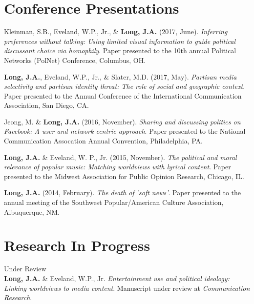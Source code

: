 \documentclass[margin,line]{res}
\begin{document}
\begin{resume}
\section{\sc Conference Presentations}

Kleinman, S.B., Eveland, W.P., Jr., \& \textbf{Long, J.A.} (2017, June). \emph{Inferring preferences without talking: Using limited visual information to guide political discussant choice via homophily}. Paper presented to the 10th annual Political Networks (PolNet) Conference, Columbus, OH.

{\bf Long, J.A.}, Eveland, W.P., Jr., \& Slater, M.D. (2017, May). \emph{Partisan media selectivity and partisan identity threat: The role of social and geographic context}. Paper presented to the Annual Conference of the International Communication Association, San Diego, CA.

Jeong, M. \&  {\bf Long, J.A.} (2016, November). \emph{Sharing and discussing politics on Facebook: A user and network-centric approach}. Paper presented to the National Communication Assocation Annual Convention, Philadelphia, PA.

{\bf Long, J.A.} \& Eveland, W. P., Jr. (2015, November). \emph{The political and moral relevance of popular music: Matching worldviews with lyrical content}. Paper presented to the Midwest Association for Public Opinion Research, Chicago, IL.


{\bf Long, J.A.} (2014, February). \emph{The death of 'soft news'}. Paper presented to the annual meeting of the Southwest Popular/American Culture Association, Albuquerque, NM.


\section{\sc Research In Progress} 

{\sc Under Review}\\
\textbf{Long, J.A.} \& Eveland, W.P., Jr. \emph{Entertainment use and political ideology: Linking worldviews to media content}. Manuscript under review at \emph{Communication Research}.


\end{resume}
\end{document}
